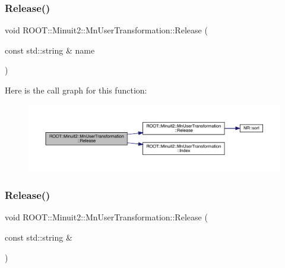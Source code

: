 \subsubsection{\texorpdfstring{Release()}{Release()}\hspace{0.1cm}{\footnotesize\ttfamily [5/6]}}
{\footnotesize\ttfamily void R\+O\+O\+T\+::\+Minuit2\+::\+Mn\+User\+Transformation\+::\+Release (\begin{DoxyParamCaption}\item[{const std\+::string \&}]{name }\end{DoxyParamCaption})}

Here is the call graph for this function\+:
\nopagebreak
\begin{figure}[H]
\begin{center}
\leavevmode
\includegraphics[width=350pt]{d9/d98/classROOT_1_1Minuit2_1_1MnUserTransformation_ac9272ca2d514e879f59b0bb7dcbf9906_cgraph}
\end{center}
\end{figure}
\mbox{\label{classROOT_1_1Minuit2_1_1MnUserTransformation_ac9272ca2d514e879f59b0bb7dcbf9906}} 
\subsubsection{\texorpdfstring{Release()}{Release()}\hspace{0.1cm}{\footnotesize\ttfamily [6/6]}}
{\footnotesize\ttfamily void R\+O\+O\+T\+::\+Minuit2\+::\+Mn\+User\+Transformation\+::\+Release (\begin{DoxyParamCaption}\item[{const std\+::string \&}]{ }\end{DoxyParamCaption})}

\mbox{\label{classROOT_1_1Minuit2_1_1MnUserTransformation_aa7b791dee11011a7442e44c85c06d650}} 
